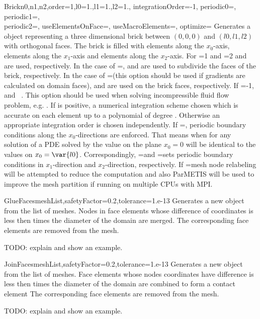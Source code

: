 \begin{funcdesc}{Brick}{n0,n1,n2,order=1,l0=1.,l1=1.,l2=1., integrationOrder=-1,
  periodic0=\False, periodic1=\False, \\ periodic2=\False, useElementsOnFace=\False, useMacroElements=\False, optimize=\False}
Generates a \Domain object representing a three dimensional brick between
$(0,0,0)$ and $(l0,l1,l2)$ with orthogonal faces. The brick is filled with
 elements along the $x_0$-axis,
 elements along the $x_1$-axis and
 elements along the $x_2$-axis.
For =1 and =2
 and
 are used, respectively.
In the case of =\False,
 and
 are used to subdivide the faces of the brick, respectively.
In the case of =\True (this option should be used if gradients
are calculated on domain faces),
 and
 are used on the brick faces, respectively.
If =-1,  and ~. This option should be used when solving incompressible fluid flow problem, e.g. .
If  is positive, a numerical integration scheme
chosen which is accurate on each element up to a polynomial of
degree  . Otherwise
an appropriate integration order is chosen independently. If
=\True, periodic boundary conditions 
along the $x_0$-directions are enforced. That means when for any solution of a PDE solved by \finley
the value on the plane $x_0=0$ will be identical to the values on $x_0=\var{l0}$. Correspondingly,
=\False and =\False sets periodic boundary conditions
in $x_1$-direction and $x_2$-direction, respectively.
If =\True mesh node relabeling will be attempted to reduce the computation and also ParMETIS will be used to improve the mesh partition if running on multiple CPUs with MPI.
\end{funcdesc}

\begin{funcdesc}{GlueFaces}{meshList,safetyFactor=0.2,tolerance=1.e-13}
Generates a new \Domain object from the list  of \finley meshes.
Nodes in face elements whose difference of coordinates is less then  times the
diameter of the domain are merged. The corresponding face elements are removed from the mesh.

TODO: explain  and show an example.
\end{funcdesc}

\begin{funcdesc}{JoinFaces}{meshList,safetyFactor=0.2,tolerance=1.e-13}
Generates a new \Domain object from the list  of \finley meshes.
Face elements whose nodes coordinates have difference is less then  times the
diameter of the domain are combined to form a contact element 
The corresponding face elements are removed from the mesh.

TODO: explain  and show an example.
\end{funcdesc}

